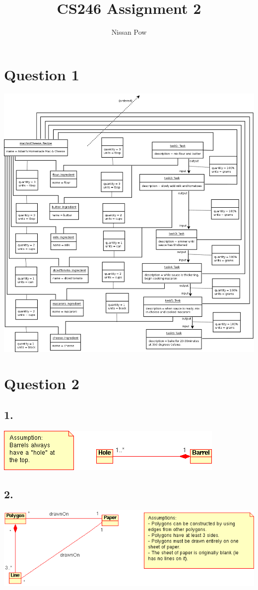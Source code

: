 \documentclass{article}[12pt]
\title{CS246 Assignment 2}
\author{Nissan Pow}
\begin{document}
\maketitle

\section*{Question 1}
\includegraphics[scale=0.32]{a2q1.png}

\section*{Question 2}
\subsection*{1.}
\includegraphics[scale=0.6]{a2q2a.png}

\subsection*{2.}
\includegraphics[scale=0.6]{a2q2b.png}
\end{document}
